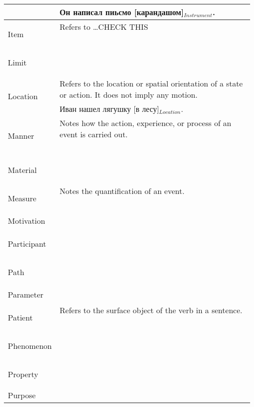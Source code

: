 \documentclass[a4paper,11pt, onecolumn,twoside]{article}
\begin{document}
\begin{longtable}{ p{}  p{} }
        & Он написал пиьсмо [карандашом]$_{Instrument}$. \\
\midrule
 \multirow{2}{*}{Item} & Refers to \ldots CHECK THIS \\ 
        & ~ \\
\midrule
 \multirow{2}{*}{Limit} &  ~ \\
        & ~ \\
\midrule
 \multirow{2}{*}{Location} & Refers to the location or spatial orientation of a state or action. It does not imply any motion. \\ 
        & Иван нашел лягушку [в лесу]$_{Location}$. \\
\midrule
 \multirow{2}{*}{Manner} & Notes how the action, experience, or process of an event is carried out. \\ 
        & ~ \\
\midrule
 \multirow{2}{*}{Material} & ~ \\ 
        & ~ \\
\midrule
 \multirow{2}{*}{Measure} & Notes the quantification of an event. \\ 
        & ~ \\
\midrule
 \multirow{2}{*}{Motivation} &  \\ 
        & ~ \\
\midrule
 \multirow{2}{*}{Participant} & ~ \\ 
        & ~ \\
\midrule
 \multirow{2}{*}{Path} & ~ \\ 
        & ~ \\
\midrule
 \multirow{2}{*}{Parameter} & \\
        & ~ \\
\midrule
 \multirow{2}{*}{Patient} & Refers to the surface object of the verb in a sentence. \\ 
        & ~ \\
\midrule
 \multirow{2}{*}{Phenomenon} & ~ \\  %
        & ~ \\
\midrule
 \multirow{2}{*}{Property} & ~ \\ 
        & ~ \\
\midrule
 \multirow{2}{*}{Purpose} & ~ \\ 

\end{longtable}
\end{document}
